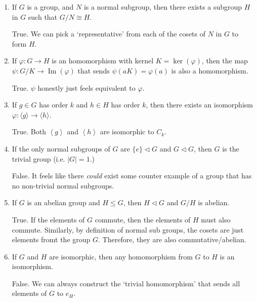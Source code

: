 \documentclass{article}
\newcommand{\ang}[1]{\left\langle #1 \right\rangle}
\begin{document}
\begin{enumerate}
{\begin{enumerate}
            \item {
                If  \(G\) is a group, and \(N\) is a normal subgroup, then there exists a subgroup \(H\) in \(G\) such that \(G/N \cong H\).
        
                True. We can pick a `representative' from each of the cosets of
                \(N\) in \(G \) to form \(H\).
            }

            \item {
                If \(\varphi\colon G \to H\) is an homomorphism with kernel \(K = \ker(\varphi)\), then the map \(\psi\colon G/K \to \operatorname{Im}(\varphi)\) that sends \(\psi(aK) = \varphi(a)\) is also a homomorphism.
        
                True. \(\psi\) honestly just feels equivalent to \(\varphi\).
            }

            \item {
                If \(g \in G\) has order \(k\) and \(h \in H\) has order \(k\), then there exists an isomorphism \(\varphi\colon \langle g \rangle \to \langle h \rangle\).
        
                True. Both \(\ang g\) and \(\ang h\) are isomorphic to \(C_k\).
            }

            \item {
                If the only normal subgroups of \(G\) are \(\{e\} \triangleleft G\) and \(G \triangleleft G\), then \(G\) is the trivial group (i.e. \(|G| = 1\).)
        
                False. It feels like there \emph{could} exist some counter example 
                of a group that has no non-trivial normal subgroups.
            }

            \item {
                If  \(G\) is an abelian group and \(H \leq G\), then \(H \triangleleft G\) and \(G/H\) is abelian.
        
                True. If the elements of \(G\) commute, then the elements of \(H\) 
                must also commute. Similarly, by definition of normal sub groups, 
                the cosets are just elements fromt the group \(G\). Therefore,
                they are also commutative/abelian.
            }

            \item {
                If \(G\) and \(H\) are isomorphic, then any homomorphism from \(G\) to \(H\) is an isomorphism.
        
                False. We can always construct the `trivial homomorphism' that sends 
                all elements of \(G\) to \(e_H\).
            }


\end{enumerate}}
\end{enumerate}
\end{document}

